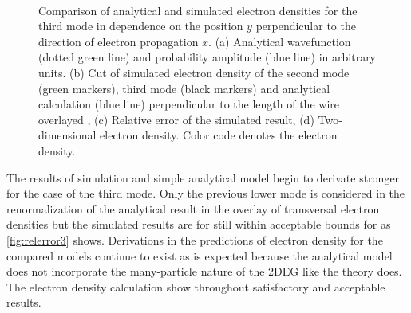 \begin{figure}[h]
  \begin{center}
 \qquad
    \\
    \qquad
    \caption{Comparison of analytical and simulated electron densities for the third mode in dependence on the position $y$ perpendicular to the direction of electron propagation $x$. (a) Analytical wavefunction (dotted green line) and probability amplitude (blue line) in arbitrary units. (b) Cut of simulated electron density of the second mode (green markers), third mode (black markers) and analytical calculation (blue line) perpendicular to the length of the wire overlayed , (c) Relative error of the simulated result, (d) Two-dimensional electron density. Color code denotes the electron density.}\label{fig:mode3}
  \end{center}
\end{figure}
The results of simulation and simple analytical model begin to derivate stronger for the case of the third mode. Only the previous lower mode is considered in the renormalization of the analytical result in the overlay of transversal electron densities but the simulated results are for still within acceptable bounds for as \cref{fig:relerror3} shows. Derivations in the predictions of electron density for the compared models continue to exist as is expected because the analytical model does not incorporate the many-particle nature of the 2DEG like the \gfnc{} theory does.
The electron density calculation show throughout satisfactory and acceptable results.\par
\FloatBarrier

